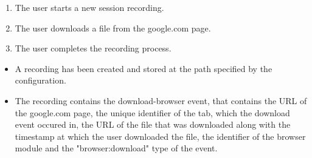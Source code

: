 \begin{tests}
	
	{\begin{enumerate}
		\item The \gls{user} starts a new \gls{session} recording.
		\item The \gls{user} downloads a file from the google.com page.
		\item The \gls{user} completes the recording process.
	\end{enumerate}}
	{\begin{itemize}
		\item A recording has been created and stored at the path specified by the configuration.
		\item The recording contains the download-browser \gls{event},  that contains the URL of the google.com page, the unique identifier of the tab, which the download \gls{event} occured in, the URL of the file that was downloaded along with the timestamp at which the \gls{user} downloaded the file, the identifier of the \gls{browser} module and the "browser:download" type of the event.
	\end{itemize}}
	
\end{tests}
